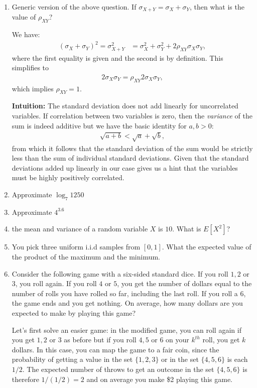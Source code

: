 \documentclass{amsart}
\theoremstyle{plain}
\numberwithin{equation}{section}
\begin{document}
\begin{enumerate}
\item Generic version of the above question. If 
$\sigma_{X+Y} = \sigma_X + \sigma_Y$, then what is the 
value of $\rho_{XY}$?

We have:
\begin{align*}
(\sigma_X + \sigma_Y)^2 = \sigma_{X+Y}^2 &= \sigma_{X}^2 + \sigma_{Y}^2 + 
2 \rho_{XY} \sigma_X \sigma_Y,
\end{align*}
where the first equality is given and the second is by 
definition. This simplifies to 
\begin{align*}
2\sigma_X \sigma_Y = \rho_{XY} 2\sigma_X \sigma_Y,
\end{align*}
which implies $\rho_{XY} = 1$.

\textbf{Intuition:} The standard deviation
does not add linearly for uncorrelated variables. 
If correlation between two variables is zero, then 
the \emph{variance} of the sum is indeed additive
but we have the basic identity for $a, b>0$:
\begin{align*}
\sqrt{a + b}<\sqrt{a} + \sqrt{b},
\end{align*}
from which it follows that the standard deviation of 
the sum would be
strictly less than the sum of individual 
standard deviations. Given that the standard 
deviations added up linearly in our case gives us 
a hint that the variables must be highly positively correlated. 


\item Approximate $\log_{7}1250$ 

\item Approximate $4^{3.6}$

\item the mean and variance of a random variable $X$ is $10$. What is
$E[X^2]$?

\item You pick three uniform i.i.d samples from $[0,1]$. What the 
expected value of the product of the maximum and the minimum.

\item Consider the following game with a six-sided standard dice. 
If you roll $1,2$ or $3$, you roll again. If you 
roll $4$ or $5$, you get the number of dollars equal 
to the number of rolls you have rolled so far, including the last
roll. If you roll a $6$, the game ends and you get nothing. On 
average, how many dollars are you expected to make by 
playing this game?

Let's first solve an easier game: in the modified game, you can
roll again if you get $1, 2$ or $3$ as before but 
if you roll $4,5$ or $6$ on your $k^{th}$ roll, you get 
$k$ dollars. In this case, you can map the game to a fair 
coin, since the 
probability of getting a value in the set $\{ 1,2,3 \}$ or 
in the set $\{ 4,5,6 \}$ is each $1/2$. The expected number of 
throws to get an outcome in the set $\{4, 5, 6 \}$ is 
therefore $1/(1/2)=2$ and on average you make \$2 playing this 
game. 


\end{enumerate}
\end{document}
